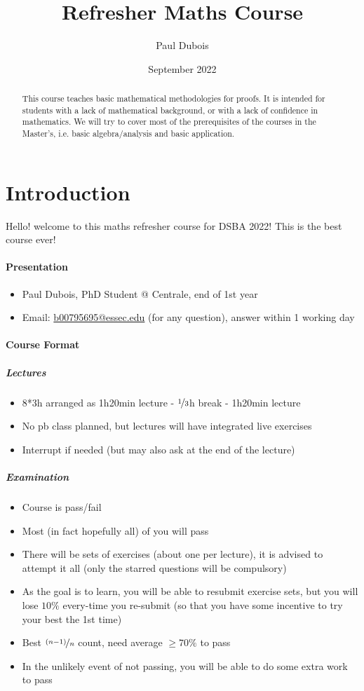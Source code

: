 \documentclass[11pt,a4paper]{article}
\title{Refresher Maths Course}
\author{Paul Dubois}
\date{September 2022}
\begin{document}
\maketitle
\begin{abstract}
    This course teaches basic mathematical methodologies for proofs.
    It is intended for students with a lack of mathematical background, or with a lack of confidence in mathematics.
    We will try to cover most of the prerequisites of the courses in the Master’s, i.e. basic algebra/analysis and basic application.
\end{abstract}
\setcounter{tocdepth}{5}
\tableofcontents
\newpage

\setcounter{section}{-1}
\section{Introduction}
Hello! welcome to this maths refresher course for DSBA 2022! This is the best course ever!
\paragraph{Presentation}
\begin{itemize}
    \item Paul Dubois, PhD Student @ Centrale, end of 1st year
    \item Email: \href{mailto:b00795695@essec.edu}{b00795695@essec.edu} (for any question), answer within 1 working day
\end{itemize}
\paragraph{Course Format}
\subparagraph{Lectures}
\begin{itemize}
    \item 8*3h arranged as 1h20min lecture - $\nicefrac{1}{3}$h break - 1h20min lecture
    \item No pb class planned, but lectures will have integrated live exercises
    \item Interrupt if needed (but may also ask at the end of the lecture)
\end{itemize}
\subparagraph{Examination}
\begin{itemize}
    \item Course is pass/fail
    \item Most (in fact hopefully all) of you will pass
    \item There will be sets of exercises (about one per lecture), it is advised to attempt it all (only the starred questions will be compulsory)
    \item As the goal is to learn, you will be able to resubmit exercise sets, but you will lose $10\%$ every-time you re-submit (so that you have some incentive to try your best the 1st time)
    \item Best $\nicefrac{(n-1)}{n}$ count, need average $\geq 70 \%$ to pass
    \item In the unlikely event of not passing, you will be able to do some extra work to pass
\end{itemize}
\end{document}
